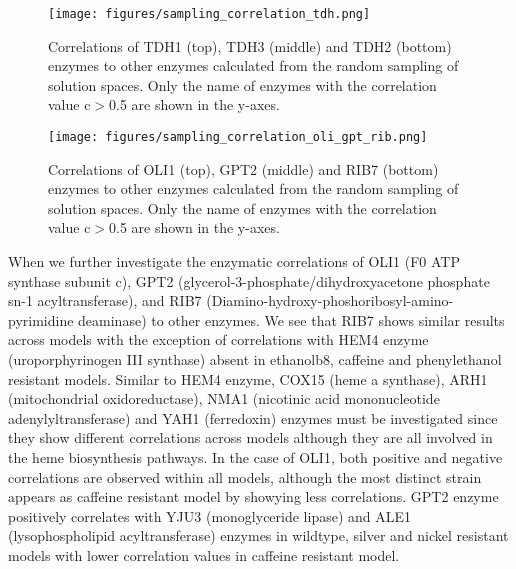 \begin{figure}[H]
  \begin{center}
  \texttt{[image: figures/sampling\_correlation\_tdh.png]}
  \caption[Correlations of TDH1 (top), TDH3 (middle) and TDH2 (bottom) enzymes to other enzymes calculated from the random sampling of solution spaces. Only the name of enzymes with the correlation value c$>$0.5 are shown in the y-axes]{Correlations of TDH1 (top), TDH3 (middle) and TDH2 (bottom) enzymes to other enzymes calculated from the random sampling of solution spaces. Only the name of enzymes with the correlation value c$>$0.5 are shown in the y-axes.}
  \label{fig:sampling_correlation_tdh}
  \end{center}
\end{figure}

\begin{figure}[H]
  \begin{center}
  \texttt{[image: figures/sampling\_correlation\_oli\_gpt\_rib.png]}
  \caption[Correlations of OLI1 (top), GPT2 (middle) and RIB7 (bottom) enzymes to other enzymes calculated from the random sampling of solution spaces. Only the name of enzymes with the correlation value c$>$0.5 are shown in the y-axes]{Correlations of OLI1 (top), GPT2 (middle) and RIB7 (bottom) enzymes to other enzymes calculated from the random sampling of solution spaces. Only the name of enzymes with the correlation value c$>$0.5 are shown in the y-axes.}
  \label{fig:sampling_correlation_oli_gpt_rib}
  \end{center}
\end{figure}

When we further investigate the enzymatic correlations of OLI1 (F0 ATP synthase subunit c), GPT2 (glycerol-3-phosphate/dihydroxyacetone phosphate sn-1 acyltransferase), and RIB7 (Diamino-hydroxy-phoshoribosyl-amino-pyrimidine deaminase) to other enzymes. We see that RIB7 shows similar results across models with the exception of correlations with HEM4 enzyme (uroporphyrinogen III synthase) absent in ethanolb8, caffeine and phenylethanol resistant models. Similar to HEM4 enzyme, COX15 (heme a synthase), ARH1 (mitochondrial oxidoreductase), NMA1 (nicotinic acid mononucleotide adenylyltransferase) and YAH1 (ferredoxin) enzymes must be investigated since they show different correlations across models although they are all involved in the heme biosynthesis pathways. In the case of OLI1, both positive and negative correlations are observed within all models, although the most distinct strain appears as caffeine resistant model by showying less correlations. GPT2 enzyme positively correlates with YJU3 (monoglyceride lipase) and ALE1 (lysophospholipid acyltransferase) enzymes in wildtype, silver and nickel resistant models with lower correlation values in caffeine resistant model.

